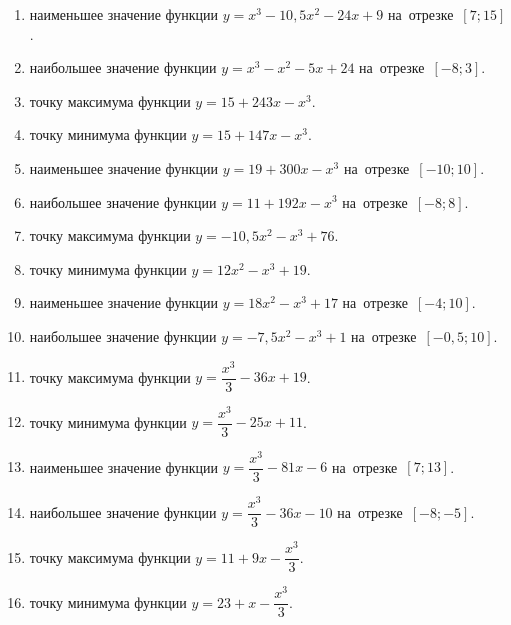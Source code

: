 \documentclass[a4paper,10pt]{article}
\begin{document}
\begin{enumerate}
\item {} наименьшее значение функции $y=x^3 -10,5x^2-24x+9$ на~отрезке~$\left[7;15\right]$.

\item {} наибольшее значение функции $y=x^3 -x^2-5x+24$ на~отрезке~$\left[-8;3\right]$.

\item {} точку максимума функции $y=15+243x-x^3$.

\item {} точку минимума функции $y=15+147x-x^3$.

\item {} наименьшее значение функции $y=19+300x-x^3$ на~отрезке~$\left[-10;10\right]$.

\item {} наибольшее значение функции $y=11+192x-x^3$ на~отрезке~$\left[-8;8\right]$.

\item {} точку максимума функции $y=-10,5x^2-x^3+76$.

\item {} точку минимума функции $y=12x^2-x^3+19$.

\item {} наименьшее значение функции $y=18x^2-x^3+17$ на~отрезке~$\left[-4;10\right]$.

\item {} наибольшее значение функции $y=-7,5x^2-x^3+1$ на~отрезке~$\left[-0,5;10\right]$.

\item {} точку максимума функции $y=\dfrac{x^3}{3} -36x+19$.

\item {} точку минимума функции $y=\dfrac{x^3}{3} -25x+11$.

\item {} наименьшее значение функции $y=\dfrac{x^3}{3} -81x-6$ на~отрезке~$\left[7;13\right]$.

\item {} наибольшее значение функции $y=\dfrac{x^3}{3} -36x-10$ на~отрезке~$\left[-8;-5\right]$.

\item {} точку максимума функции $y=11 +9x-\dfrac{x^3}{3}$.

\item {} точку минимума функции $y=23 +x-\dfrac{x^3}{3}$.


\end{enumerate}
\end{document}
